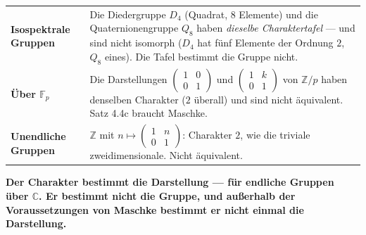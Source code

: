 \begin{warnung}
\begin{center}
{\small
\renewcommand{\arraystretch}{1.5}
\begin{tabular}{@{}P{3.2cm}P{5.4cm}@{}}
\toprule
\textbf{Isospektrale Gruppen} & Die Diedergruppe $D_4$ (Quadrat, $8$ Elemente) und die Quaternionengruppe $Q_8$ haben \emph{dieselbe Charaktertafel} --- und sind nicht isomorph ($D_4$ hat fünf Elemente der Ordnung $2$, $Q_8$ eines). Die Tafel bestimmt die Gruppe nicht.\\
\textbf{Über $\mathbb F_p$} & Die Darstellungen $\begin{pmatrix}1 & 0\\ 0 & 1\end{pmatrix}$ und $\begin{pmatrix}1 & k\\ 0 & 1\end{pmatrix}$ von $\mathbb Z/p$ haben denselben Charakter ($2$ überall) und sind nicht äquivalent. Satz 4.4c braucht Maschke.\\
\textbf{Unendliche Gruppen} & $\mathbb Z$ mit $n\mapsto\begin{pmatrix}1 & n\\ 0 & 1\end{pmatrix}$: Charakter $2$, wie die triviale zweidimensionale. Nicht äquivalent.\\
\bottomrule
\end{tabular}}
\end{center}

\begin{center}
\begin{minipage}{0.9\textwidth}
\textbf{Der Charakter bestimmt die Darstellung --- für endliche Gruppen über $\mathbb C$. Er bestimmt nicht die Gruppe, und außerhalb der Voraussetzungen von Maschke bestimmt er nicht einmal die Darstellung.}
\end{minipage}
\end{center}

\begin{center}
\begin{minipage}{0.88\textwidth}
\end{minipage}
\end{center}
\end{warnung}

